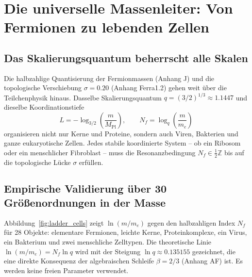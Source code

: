 \documentclass[11pt,a4paper]{article}
\begin{document}
	\section{Die universelle Massenleiter: Von Fermionen zu lebenden Zellen}
	\label{sec:ladder_cells}
	
	\subsection{Das Skalierungsquantum beherrscht alle Skalen}
	
	Die halbzahlige Quantisierung der Fermionmassen (Anhang J) und die topologische Verschiebung \(\sigma = 0.20\) (Anhang Ferra1.2) gehen weit über die Teilchenphysik hinaus. Dasselbe Skalierungsquantum \(q = (3/2)^{1/3} \approx 1.1447\) und dieselbe Koordinationstiefe
	\[
	L = -\log_{3/2}\left(\frac{m}{M_{\mathrm{Pl}}}\right), \qquad
	N_f = \log_q\left(\frac{m}{m_e}\right)
	\]
	organisieren nicht nur Kerne und Proteine, sondern auch Viren, Bakterien und ganze eukaryotische Zellen. Jedes stabile koordinierte System – ob ein Ribosom oder ein menschlicher Fibroblast – muss die Resonanzbedingung \(N_f \in \frac{1}{2}\mathbb{Z}\) bis auf die topologische Lücke \(\sigma\) erfüllen.
	
	\subsection{Empirische Validierung über 30 Größenordnungen in der Masse}
	
	Abbildung~\ref{fig:ladder_cells} zeigt \(\ln(m/m_e)\) gegen den halbzahligen Index \(N_f\) für 28 Objekte: elementare Fermionen, leichte Kerne, Proteinkomplexe, ein Virus, ein Bakterium und zwei menschliche Zelltypen. Die theoretische Linie \(\ln(m/m_e) = N_f \ln q\) wird mit der Steigung \(\ln q \approx 0.135155\) gezeichnet, die eine direkte Konsequenz der algebraischen Schleife \(\beta = 2/3\) (Anhang AF) ist. Es werden keine freien Parameter verwendet.
	
\end{document}
